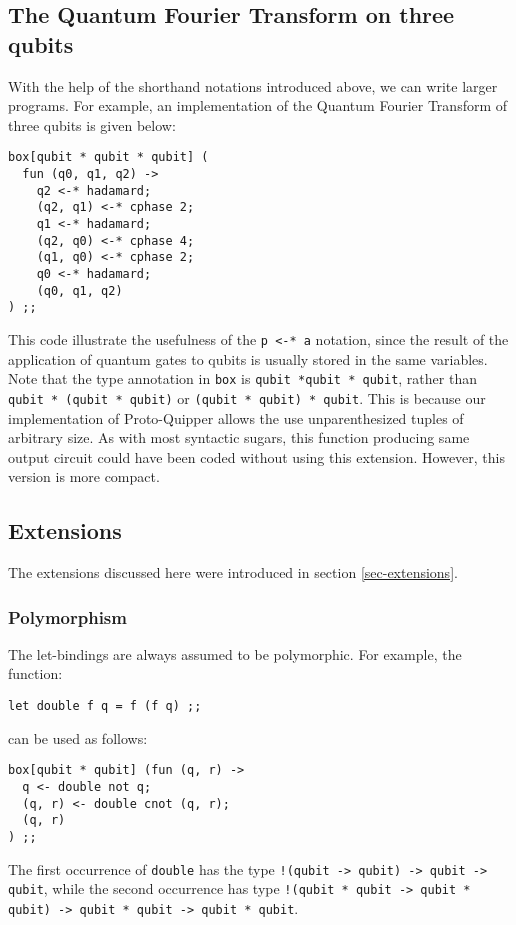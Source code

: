 \subsection{The Quantum Fourier Transform on three qubits}

With the help of the shorthand notations introduced above, we can write 
larger programs. For example, an implementation of the Quantum Fourier 
Transform of three qubits is given below:
\begin{verbatim}
box[qubit * qubit * qubit] (
  fun (q0, q1, q2) ->
    q2 <-* hadamard;
    (q2, q1) <-* cphase 2;
    q1 <-* hadamard;
    (q2, q0) <-* cphase 4;
    (q1, q0) <-* cphase 2;
    q0 <-* hadamard;
    (q0, q1, q2)
) ;;
\end{verbatim}
This code illustrate the usefulness of the \verb#p <-* a# notation, since 
the result of the application of quantum gates to qubits is usually stored 
in the same variables. Note that the type annotation in \verb#box# is 
\verb#qubit *qubit * qubit#, rather than \verb#qubit * (qubit * qubit)# or 
\verb#(qubit * qubit) * qubit#. This is because our implementation of 
Proto-Quipper allows the use unparenthesized tuples of arbitrary size. As 
with most syntactic sugars, this function producing same output circuit 
could have been coded without using this extension. However, this version 
is more compact. 

\subsection{Extensions}

The extensions discussed here were introduced in section 
\hyperref[sec-extensions]{\ref*{sec-extensions}}. 

\subsubsection{Polymorphism}

The let-bindings are always assumed to be polymorphic. For example, the 
function:
\begin{verbatim}
let double f q = f (f q) ;;
\end{verbatim}
can be used as follows:
\begin{verbatim}
box[qubit * qubit] (fun (q, r) ->
  q <- double not q;
  (q, r) <- double cnot (q, r);
  (q, r)
) ;;
\end{verbatim}
The first occurrence of \verb#double# has the type 
\verb#!(qubit -> qubit) -> qubit -> qubit#, while the second occurrence has type 
\verb#!(qubit * qubit -> qubit * qubit) -> qubit * qubit -> qubit * qubit#.

